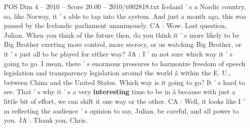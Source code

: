 \begin{textsample}{POS Dim 4 – 2010 – Score 20.00 – 2010/t002818.txt}
Iceland ' s a Nordic country, so, like Norway, it ' s able to tap into the system.
And just a month ago, this was passed by the Icelandic parliament unanimously.
CA : Wow.
Last question, Julian.
When you think of the future then, do you think it ' s more likely to be Big Brother exerting more control, more secrecy, or us watching Big Brother, or it ' s just all to be played for either way?
JA : I ' m not sure which way it ' s going to go.
I mean, there ' s enormous pressures to harmonize freedom of speech legislation and transparency legislation around the world â within the E.
U., between China and the United States.
Which way is it going to go?
It ' s hard to see.
That ' s why it ' s a very \textbf{interesting} time to be in â because with just a little bit of effort, we can shift it one way or the other.
CA : Well, it looks like I ' m reflecting the audience ' s opinion to say, Julian, be careful, and all power to you.
JA : Thank you, Chris.

\end{textsample}
